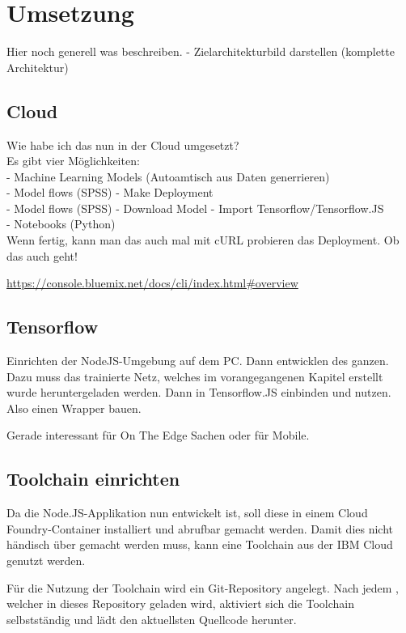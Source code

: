 \section{Umsetzung}
Hier noch generell was beschreiben. - Zielarchitekturbild darstellen (komplette Architektur)

\subsection{Cloud}
Wie habe ich das nun in der Cloud umgesetzt?\\
Es gibt vier Möglichkeiten:\\
- Machine Learning Models (Autoamtisch aus Daten generrieren)\\
- Model flows (SPSS) - Make Deployment\\
- Model flows (SPSS) - Download Model - Import Tensorflow/Tensorflow.JS\\
- Notebooks (Python)\\

Wenn fertig, kann man das auch mal mit cURL probieren das Deployment. Ob das auch geht!

\url{https://console.bluemix.net/docs/cli/index.html#overview}

\subsection{Tensorflow}
Einrichten der NodeJS-Umgebung auf dem PC. Dann entwicklen des ganzen. Dazu muss das trainierte Netz, welches im vorangegangenen
Kapitel erstellt wurde heruntergeladen werden. Dann in Tensorflow.JS einbinden und nutzen. Also einen Wrapper bauen.

Gerade interessant für On The Edge Sachen oder für Mobile.

\subsection{Toolchain einrichten}
Da die Node.JS-Applikation nun entwickelt ist, soll diese in einem Cloud Foundry-Container installiert und abrufbar
gemacht werden. Damit dies nicht händisch über  gemacht werden muss, kann eine Toolchain aus der IBM Cloud
genutzt werden.

Für die Nutzung der Toolchain wird ein Git-Repository angelegt. Nach jedem , welcher in dieses Repository
geladen wird, aktiviert sich die Toolchain selbstständig und lädt den aktuellsten Quellcode herunter.

